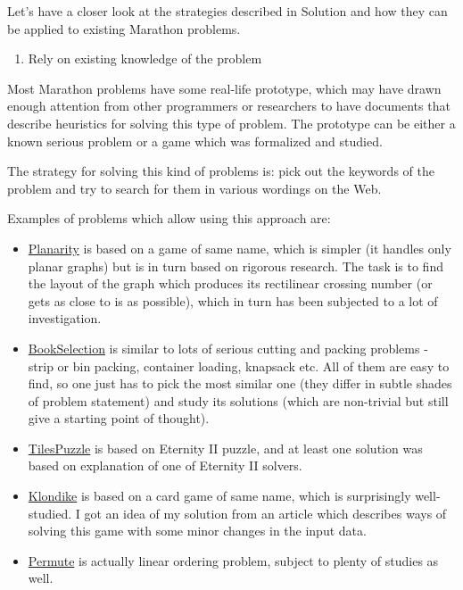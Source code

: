 Let's have a closer look at the strategies described in Solution and how
they can be applied to existing Marathon problems.

\begin{enumerate}
\def\labelenumi{\arabic{enumi}.}
\tightlist
\item
  Rely on existing knowledge of the problem
\end{enumerate}

Most Marathon problems have some real-life prototype, which may have
drawn enough attention from other programmers or researchers to have
documents that describe heuristics for solving this type of problem. The
prototype can be either a known serious problem or a game which was
formalized and studied.

The strategy for solving this kind of problems is: pick out the keywords
of the problem and try to search for them in various wordings on the
Web.

Examples of problems which allow using this approach are:

\begin{itemize}
\item
  \href{http://www.topcoder.com/longcontest/?module=ViewProblemStatement\&rd=14300\&pm=10942}{Planarity}
  is based on a game of same name, which is simpler (it handles only
  planar graphs) but is in turn based on rigorous research. The task is
  to find the layout of the graph which produces its rectilinear
  crossing number (or gets as close to is as possible), which in turn
  has been subjected to a lot of investigation.
\item
  \href{http://www.topcoder.com/longcontest/?module=ViewProblemStatement\&rd=14227\&pm=10885}{BookSelection}
  is similar to lots of serious cutting and packing problems - strip or
  bin packing, container loading, knapsack etc. All of them are easy to
  find, so one just has to pick the most similar one (they differ in
  subtle shades of problem statement) and study its solutions (which are
  non-trivial but still give a starting point of thought).
\item
  \href{http://www.topcoder.com/longcontest/?module=ViewProblemStatement\&rd=13897\&pm=10474}{TilesPuzzle}
  is based on Eternity II puzzle, and at least one solution was based on
  explanation of one of Eternity II solvers.
\item
  \href{http://www.topcoder.com/longcontest/?module=ViewProblemStatement\&rd=13565\&pm=10014}{Klondike}
  is based on a card game of same name, which is surprisingly
  well-studied. I got an idea of my solution from an article which
  describes ways of solving this game with some minor changes in the
  input data.
\item
  \href{http://www.topcoder.com/longcontest/?module=ViewProblemStatement\&rd=10932\&pm=8426}{Permute}
  is actually linear ordering problem, subject to plenty of studies as
  well.
\end{itemize}

